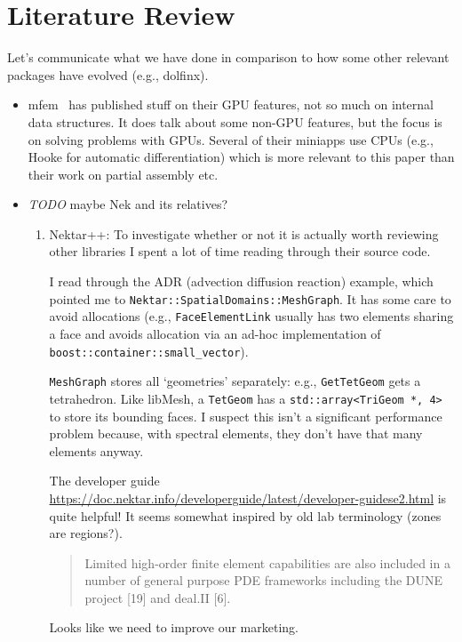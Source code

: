 \documentclass[11pt]{article}
\begin{document}
\section{Literature Review}
Let's communicate what we have done in comparison to how some other relevant
packages have evolved (e.g., dolfinx).
\begin{itemize}
  \item mfem~\cite{MFEM} has published stuff on their GPU features, not so much
    on internal data structures. It does talk about some non-GPU features, but
    the focus is on solving problems with GPUs. Several of their miniapps use
    CPUs (e.g., Hooke for automatic differentiation) which is more relevant to
    this paper than their work on partial assembly etc.

  \item \emph{TODO} maybe Nek and its relatives?
    \begin{enumerate}
      \item Nektar++: To investigate whether or not it is actually worth reviewing
        other libraries I spent a lot of time reading through their source code.

        I read through the ADR (advection diffusion reaction) example, which
        pointed me to \texttt{Nektar::SpatialDomains::MeshGraph}. It has some
        care to avoid allocations (e.g., \texttt{FaceElementLink} usually has
        two elements sharing a face and avoids allocation via an ad-hoc
        implementation of \texttt{boost::container::small\_vector}).

        \texttt{MeshGraph} stores all `geometries' separately: e.g.,
        \texttt{GetTetGeom} gets a tetrahedron. Like libMesh, a \texttt{TetGeom}
        has a \texttt{std::array<TriGeom *, 4>} to store its bounding faces. I
        suspect this isn't a significant performance problem because, with
        spectral elements, they don't have that many elements anyway.

        The developer guide
        \url{https://doc.nektar.info/developerguide/latest/developer-guidese2.html}
        is quite helpful! It seems somewhat inspired by old lab terminology
        (zones are regions?).

        \begin{quote}
          Limited high-order finite element capabilities are also included in a
          number of general purpose PDE frameworks including the DUNE project
          [19] and deal.II [6].
        \end{quote}
        Looks like we need to improve our marketing.
    \end{enumerate}


\end{itemize}
\end{document}
